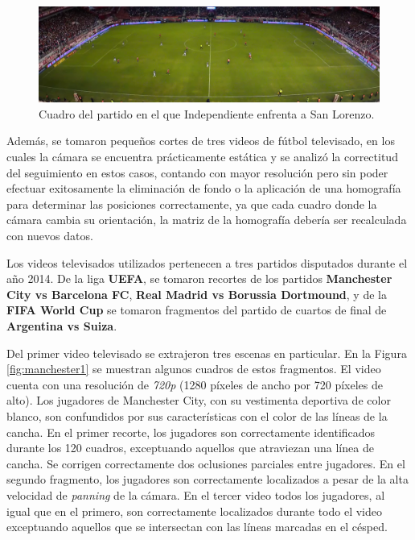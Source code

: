 \begin{figure}[H]
  \centering
  \includegraphics[width=\linewidth]{./images/independ-figura.png}
  \caption{Cuadro del partido en el que Independiente enfrenta a San Lorenzo.}
  \label{fig:independ-figura}
\end{figure}

Además, se tomaron pequeños cortes de tres videos de fútbol televisado, en los
cuales la cámara se encuentra prácticamente estática y se analizó la
correctitud del seguimiento en estos casos, contando con mayor resolución pero
sin poder efectuar exitosamente la eliminación de fondo o la aplicación de una
homografía para determinar las posiciones correctamente, ya que cada cuadro
donde la cámara cambia su orientación, la matriz de la homografía debería ser
recalculada con nuevos datos.

Los videos televisados utilizados pertenecen a tres partidos disputados durante
el año 2014. De la liga \textbf{UEFA}, se tomaron recortes de los partidos
\textbf{Manchester City vs Barcelona FC}, \textbf{Real Madrid vs Borussia
Dortmound}, y de la \textbf{FIFA World Cup} se tomaron fragmentos del partido
de cuartos de final de \textbf{Argentina vs Suiza}.

Del primer video televisado se extrajeron tres escenas en particular. En la
Figura \ref{fig:manchester1} se muestran algunos cuadros de estos fragmentos.
El video cuenta con una resolución de \textit{720p} (1280 píxeles de ancho por
720 píxeles de alto). Los jugadores de Manchester City, con su vestimenta
deportiva de color blanco, son confundidos por sus características con el color
de las líneas de la cancha. En el primer recorte, los jugadores son
correctamente identificados durante los 120 cuadros, exceptuando aquellos que
atraviezan una línea de cancha. Se corrigen correctamente dos oclusiones
parciales entre jugadores. En el segundo fragmento, los jugadores son
correctamente localizados a pesar de la alta velocidad de \textit{panning} de
la cámara. En el tercer video todos los jugadores, al igual que en el primero,
son correctamente localizados durante todo el video exceptuando aquellos que se
intersectan con las líneas marcadas en el césped.

